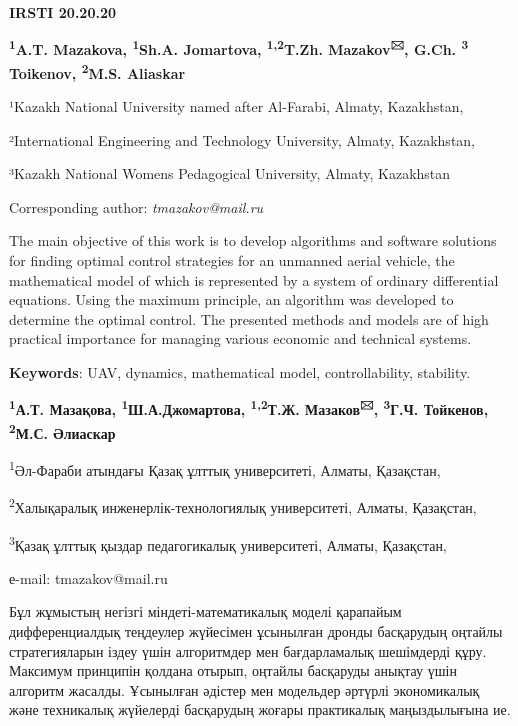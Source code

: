 
\newpage
{\bfseries IRSTI 20.20.20}


\begin{center}

{\bfseries \textsuperscript{1}A.T. Mazakova, \textsuperscript{1}Sh.A.
Jomartova, \textsuperscript{1,2}T.Zh. Mazakov\textsuperscript{🖂}, G.Ch.
\textsuperscript{3} Toikenov, \textsuperscript{2}M.S. Aliaskar}

¹Kazakh National University named after Al-Farabi, Almaty, Kazakhstan,

²International Engineering and Technology University, Almaty,
Kazakhstan,

³Kazakh National Women\textquotesingle s Pedagogical University, Almaty,
Kazakhstan
\end{center}
Corresponding author: \emph{ tmazakov@mail.ru} \vspace{0.5cm}

The main objective of this work is to develop algorithms and software
solutions for finding optimal control strategies for an unmanned aerial
vehicle, the mathematical model of which is represented by a system of
ordinary differential equations. Using the maximum principle, an
algorithm was developed to determine the optimal control. The presented
methods and models are of high practical importance for managing various
economic and technical systems.

{\bfseries Keywords}: UAV, dynamics, mathematical model, controllability,
stability.


\begin{center}
{\bfseries \textsuperscript{1}А.Т. Мазақова,
\textsuperscript{1}Ш.А.Джомартова, \textsuperscript{1,2}Т.Ж.
Мазаков\textsuperscript{🖂}, \textsuperscript{3}Г.Ч. Тойкенов, \textsuperscript{2}М.С. Әлиаскар}

\textsuperscript{1}Әл-Фараби атындағы Қазақ ұлттық университеті, Алматы,
Қазақстан,

\textsuperscript{2}Халықаралық инженерлік-технологиялық университеті,
Алматы, Қазақстан,

\textsuperscript{3}Қазақ ұлттық қыздар педагогикалық университеті,
Алматы, Қазақстан,

е-mail: tmazakov@mail.ru
\end{center}


Бұл жұмыстың негізгі міндеті-математикалық моделі қарапайым
дифференциалдық теңдеулер жүйесімен ұсынылған дронды басқарудың оңтайлы
стратегияларын іздеу үшін алгоритмдер мен бағдарламалық шешімдерді құру.
Максимум принципін қолдана отырып, оңтайлы басқаруды анықтау үшін
алгоритм жасалды. Ұсынылған әдістер мен модельдер әртүрлі экономикалық
және техникалық жүйелерді басқарудың жоғары практикалық маңыздылығына
ие.

